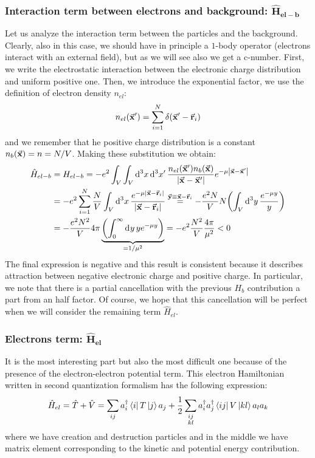 \documentclass[../main/main.tex]{subfiles}
\begin{document}
\subsubsection{Interaction term between electrons and background: \( \mathbf{\hat{H}_{el-b} } \) }
Let us analyze the interaction term between the particles and the background. Clearly, also in this case, we should have in principle a \( 1 \)-body operator   (electrons interact with an external field), but as we will see also we get a c-number. First, we write the electrostatic interaction between the electronic charge distribution and uniform positive one. Then, we introduce the exponential factor, we use the definition of electron density \( n_{el} \):
\begin{equation}
  n_{el}(\va{x}') = \sum_{i=1}^{N} \delta (\va{x}'-\va{r}_i)
\end{equation}
and we remember that he positive charge distribution is a constant \( n_b (\va{x})= n = N/V \). Making these substitution we obtain:
\begin{equation*}
\begin{split}
  \hat{H}_{el-b} &= H_{el-b} = - e^2 \int_{V}^{} \int_{V}^{} \dd[3]{x} \dd[3]{x'} \frac{n_{el} (\va{x}') n_b (\va{x}) }{\abs{\va{x}-\va{x}'}  } e^{-\mu \abs{\va{x}-\va{x}'} } \\
  &= - e^2 \sum_{i=1}^{N} \frac{N}{V} \int_{V}^{} \dd[3]{x} \frac{e^{-\mu \abs{\va{x}-\va{r}_i} } }{\abs{\va{x}-\va{r}_i} } \overset{\va{y} \equiv \va{x}- \va{r}_i}{=} -\frac{e^2N}{V} N \qty(\int_{V}^{} \dd[3]{y} \frac{e^{-\mu y} }{y}  ) \\
  &= - \frac{e^2N^2}{V}4 \pi \underbrace{\qty(\int_{0}^{\infty } \dd[]{y}y e^{-\mu y}   )}_{=1/\mu ^2}  = - e^2 \frac{N^2}{V} \frac{4 \pi }{\mu ^2} <0
\end{split}
\end{equation*}
The final expression is negative and this result is consistent because it describes attraction between negative electronic charge and positive charge. In particular, we note that there is a partial cancellation with the previous \( H_b \) contribution a part from an half factor. Of course, we hope that this cancellation will be perfect when we will consider the remaining term \( \hat{H}_{el}  \).

\subsubsection{Electrons term: \( \pmb{\hat{H}_{el}}  \)}
It is the most interesting part but also the most difficult one because of the presence of the electron-electron potential term. This electron Hamiltonian written in second quantization formalism has the following expression:
\begin{equation*}
  \hat{H}_{el} = \hat{T}+\hat{V}= \sum_{ij}^{}a_i ^\dag \bra{i}T \ket{j}a_j + \frac{1}{2} \sum_{\substack{ij \\ kl} }^{} a_i ^\dag a_j ^\dag \bra{ij}V \ket{kl} a_l a_k
\end{equation*}
where we have creation and destruction particles and in the middle we have matrix element corresponding to the kinetic and potential energy contribution.
\end{document}
